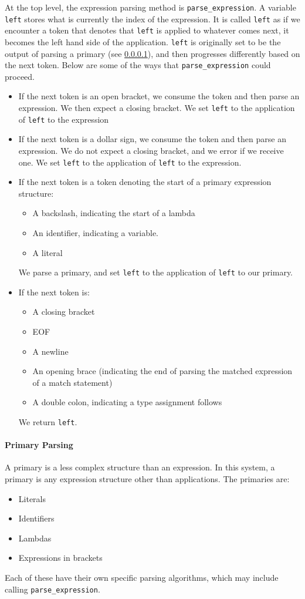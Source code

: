 At the top level, the expression parsing method is \verb|parse_expression|. A variable \verb|left| stores what is currently the index of the expression. It is called \verb|left| as if we encounter a token that denotes that \verb|left| is applied to whatever comes next, it becomes the left hand side of the application. \verb|left| is originally set to be the output of parsing a primary (see \ref{impl:parsing_primary}), and then progresses differently based on the next token.  Below are some of the ways that \verb|parse_expression| could proceed.
\begin{itemize}
    \item If the next token is an open bracket, we consume the token and then parse an expression. We then expect a closing bracket. We set \verb|left| to the application of \verb|left| to the expression
    \item If the next token is a dollar sign, we consume the token and then parse an expression. We do not expect a closing bracket, and we error if we receive one. We set \verb|left| to the application of \verb|left| to the expression.    
    \item If the next token is a token denoting the start of a primary expression structure:
    \begin{itemize}
        \item A backslash, indicating the start of a lambda
        \item An identifier, indicating a variable.
        \item A literal
    \end{itemize}
    We parse a primary, and set \verb|left| to the application of \verb|left| to our primary.
    \item If the next token is:
    \begin{itemize}
        \item A closing bracket
        \item EOF
        \item A newline
        \item An opening brace (indicating the end of parsing the matched expression of a match statement)
        \item A double colon, indicating a type assignment follows
    \end{itemize}
    We return \verb|left|. 
\end{itemize}

\paragraph{Primary Parsing}
\label{impl:parsing_primary}
A primary is a less complex structure than an expression. In this system, a primary is any expression structure other than applications. The primaries are:
\begin{itemize}
    \item Literals
    \item Identifiers
    \item Lambdas
    \item Expressions in brackets
\end{itemize}
Each of these have their own specific parsing algorithms, which may include calling \verb|parse_expression|. 

